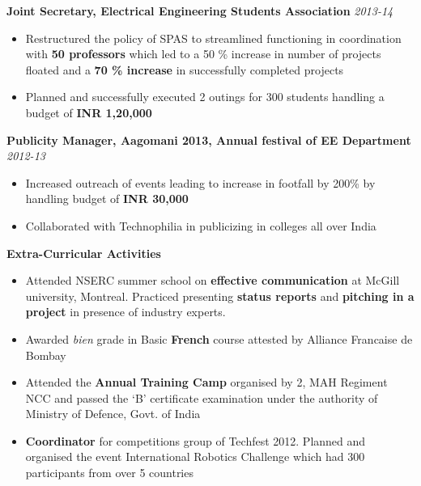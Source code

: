 \documentclass[a4paper,10pt]{article}
\newcommand{\resheading}[1]{
	{\large \colorbox{mygrey}{\begin{minipage}{\textwidth}{\textbf{#1 \vphantom{p\^{E}}}}\end{minipage}}}
}
\newcommand{\ressubheadingother}[2]{
	\textbf{#1} \hfill \textit{#2}\null
	\vspace{-4pt}
}
\begin{document}
	\ressubheadingother{Joint Secretary, Electrical Engineering Students Association}{2013-14}
	\begin{itemize} \itemsep -1pt
		\item Restructured the policy of SPAS to streamlined functioning in coordination with \textbf{50 professors} which led to a 50 \% increase in number of projects floated and a \textbf{70 \% increase} in successfully completed projects
		\item Planned and successfully executed 2 outings for 300 students handling a budget of \textbf{INR 1,20,000}
	\end{itemize}

	\ressubheadingother{Publicity Manager, Aagomani 2013, Annual festival of EE Department}{2012-13}
	\begin{itemize}\itemsep -1pt
		\item Increased outreach of events leading to increase in footfall by 200\% by handling budget of \textbf{INR 30,000}  
		\item Collaborated with Technophilia in publicizing in colleges all over India
	\end{itemize}
	
\resheading{Extra-Curricular Activities}
	\begin{itemize}[label={--}]\itemsep -1pt
		\item Attended NSERC summer school on \textbf{effective communication} at McGill university, Montreal. Practiced presenting \textbf{status reports} and \textbf{pitching in a project} in presence of industry experts.
		\item Awarded \textit{bien} grade in Basic \textbf{French} course attested by Alliance Francaise de Bombay
		\item Attended the \textbf{Annual Training Camp} organised by 2, MAH Regiment NCC and passed the ‘B’ certificate examination under the authority of Ministry of Defence, Govt. of India
		\item \textbf{Coordinator} for competitions group of Techfest 2012. Planned and organised the event International Robotics Challenge which had 300 participants from over 5 countries
	\end{itemize}
\end{document}
